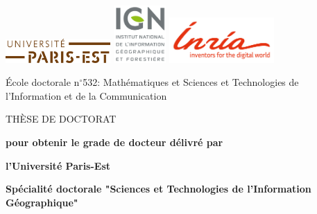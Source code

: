 \begin{titlepage}
    \begin{center}
        \includegraphics[width=4cm]{images/logos/paris-est_logo}
        \includegraphics[width=2cm]{images/logos/ign_logo}
        \includegraphics[width=4cm]{images/logos/inr_logo_eng_rouge_150}\\
    
        \vspace*{10mm}
        
        \'{E}cole doctorale n\ensuremath{^\circ}532: Mathématiques et Sciences et Technologies de l'Information et de la Communication
        
        \vspace*{5mm}

        \begin{Huge}
            TH\`{E}SE DE DOCTORAT
        \end{Huge}

        \vspace*{5mm}

        \textbf{pour obtenir le grade de docteur délivré par}

        \vspace*{5mm}

        \begin{LARGE}
            \textbf{l'Université Paris-Est}
        \end{LARGE}

        \vspace*{2.5mm}
        \begin{large}
        \textbf{Spécialité doctorale "Sciences et Technologies de l'Information Géographique"}
        \end{large}
        \vspace*{10mm}


\end{center}
\end{titlepage}
